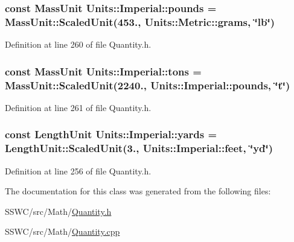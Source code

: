 \hypertarget{class_units_1_1_imperial_a25954e93175ecbf7c8dcc870e6c01dd4}{
\subsubsection[{pounds}]{\setlength{\rightskip}{0pt plus 5cm}const {\bf Mass\+Unit} Units\+::\+Imperial\+::pounds = {\bf Mass\+Unit\+::\+Scaled\+Unit}(453., {\bf Units\+::\+Metric\+::grams}, \char`\"{}lb\char`\"{})\hspace{0.3cm}{\ttfamily [static]}}}\label{class_units_1_1_imperial_a25954e93175ecbf7c8dcc870e6c01dd4}


Definition at line 260 of file Quantity.\+h.

\hypertarget{class_units_1_1_imperial_aa704afada0bf66bfb942b92b880e425e}{
\subsubsection[{tons}]{\setlength{\rightskip}{0pt plus 5cm}const {\bf Mass\+Unit} Units\+::\+Imperial\+::tons = {\bf Mass\+Unit\+::\+Scaled\+Unit}(2240., {\bf Units\+::\+Imperial\+::pounds}, \char`\"{}t\char`\"{})\hspace{0.3cm}{\ttfamily [static]}}}\label{class_units_1_1_imperial_aa704afada0bf66bfb942b92b880e425e}


Definition at line 261 of file Quantity.\+h.

\hypertarget{class_units_1_1_imperial_ae2bee79b25bd5888d7e6b454a057cb66}{
\subsubsection[{yards}]{\setlength{\rightskip}{0pt plus 5cm}const {\bf Length\+Unit} Units\+::\+Imperial\+::yards = {\bf Length\+Unit\+::\+Scaled\+Unit}(3., {\bf Units\+::\+Imperial\+::feet}, \char`\"{}yd\char`\"{})\hspace{0.3cm}{\ttfamily [static]}}}\label{class_units_1_1_imperial_ae2bee79b25bd5888d7e6b454a057cb66}


Definition at line 256 of file Quantity.\+h.



The documentation for this class was generated from the following files\+:\begin{DoxyCompactItemize}
\item 
S\+S\+W\+C/src/\+Math/\hyperlink{_quantity_8h}{Quantity.\+h}\item 
S\+S\+W\+C/src/\+Math/\hyperlink{_quantity_8cpp}{Quantity.\+cpp}\end{DoxyCompactItemize}
